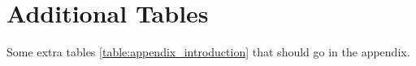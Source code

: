 \section{Additional Tables}
Some extra tables \ref{table:appendix_introduction} that should go in the appendix.

